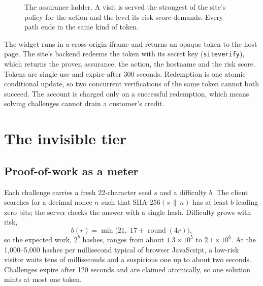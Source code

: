 \documentclass[11pt]{article}
\begin{document}
\begin{figure}[H]
\centering
{}
\caption{The assurance ladder. A visit is served the strongest of the site's policy for the action
and the level its risk score demands. Every path ends in the same kind of token.}
\label{fig:ladder}
\end{figure}

The widget runs in a cross-origin iframe and returns an opaque token to the host page. The
site's backend redeems the token with its secret key (\texttt{siteverify}), which returns the
proven assurance, the action, the hostname and the risk score. Tokens are single-use and expire
after 300 seconds. Redemption is one atomic conditional update, so two concurrent verifications
of the same token cannot both succeed. The account is charged only on a successful redemption,
which means solving challenges cannot drain a customer's credit.

\section{The invisible tier}

\subsection{Proof-of-work as a meter}

Each challenge carries a fresh 22-character seed $s$ and a difficulty $b$. The client searches
for a decimal nonce $n$ such that $\mathrm{SHA\text{-}256}(s \,\|\, n)$ has at least $b$ leading
zero bits; the server checks the answer with a single hash. Difficulty grows with risk,
\begin{equation}
  b(r) = \min\bigl(21,\; 17 + \operatorname{round}(4r)\bigr),
\end{equation}
so the expected work, $2^{b}$ hashes, ranges from about $1.3 \times 10^5$ to $2.1 \times 10^6$.
At the 1{,}000--5{,}000 hashes per millisecond typical of browser JavaScript, a low-risk visitor
waits tens of milliseconds and a suspicious one up to about two seconds. Challenges expire after
120 seconds and are claimed atomically, so one solution mints at most one token.
\end{document}
